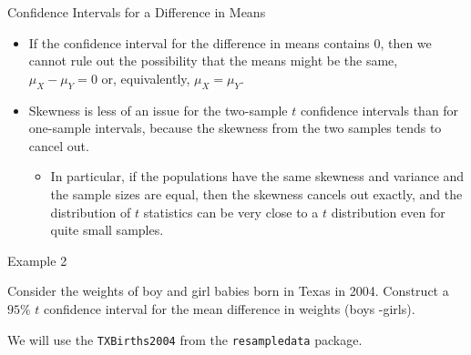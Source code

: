 \documentclass[
  ignorenonframetext,
]{beamer}
\providecommand{\tightlist}{%
  \setlength{\itemsep}{0pt}\setlength{\parskip}{0pt}}
\begin{document}
\begin{frame}{Confidence Intervals for a Difference in Means}
\protect\hypertarget{confidence-intervals-for-a-difference-in-means-2}{}
\begin{itemize}
\item
  If the confidence interval for the difference in means contains 0,
  then we cannot rule out the possibility that the means might be the
  same, \(\mu_X-\mu_Y=0\) or, equivalently, \(\mu_X=\mu_Y\).
\item
  Skewness is less of an issue for the two-sample \(t\) confidence
  intervals than for one-sample intervals, because the skewness from the
  two samples tends to cancel out.

  \begin{itemize}
  \tightlist
  \item
    In particular, if the populations have the same skewness and
    variance and the sample sizes are equal, then the skewness cancels
    out exactly, and the distribution of \(t\) statistics can be very
    close to a \(t\) distribution even for quite small samples.
  \end{itemize}
\end{itemize}
\end{frame}

\begin{frame}[fragile]{Example 2}
\protect\hypertarget{example-2}{}
\begin{tcolorbox}
Consider the weights of boy and girl babies born in Texas in 2004. Construct a $95\%$ $t$ confidence interval for the mean difference in weights (boys -girls).
\end{tcolorbox}

We will use the \texttt{TXBirths2004} from the \texttt{resampledata}
package.
\end{frame}
\end{document}
